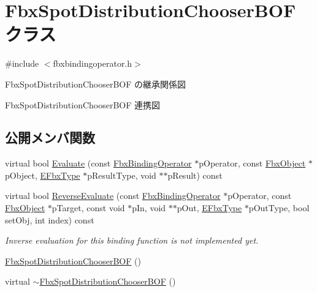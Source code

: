 \hypertarget{class_fbx_spot_distribution_chooser_b_o_f}{}\section{Fbx\+Spot\+Distribution\+Chooser\+B\+OF クラス}
\label{class_fbx_spot_distribution_chooser_b_o_f}


{\ttfamily \#include $<$fbxbindingoperator.\+h$>$}



Fbx\+Spot\+Distribution\+Chooser\+B\+OF の継承関係図


Fbx\+Spot\+Distribution\+Chooser\+B\+OF 連携図
\subsection*{公開メンバ関数}
\begin{DoxyCompactItemize}
\item 
virtual bool \hyperlink{class_fbx_spot_distribution_chooser_b_o_f_a3372ac6ab54e4d20b6646b953f7feecf}{Evaluate} (const \hyperlink{class_fbx_binding_operator}{Fbx\+Binding\+Operator} $\ast$p\+Operator, const \hyperlink{class_fbx_object}{Fbx\+Object} $\ast$p\+Object, \hyperlink{fbxpropertytypes_8h_a73913a5ddfb20e57c6f25e9e6784bd92}{E\+Fbx\+Type} $\ast$p\+Result\+Type, void $\ast$$\ast$p\+Result) const
\item 
virtual bool \hyperlink{class_fbx_spot_distribution_chooser_b_o_f_a8442158a644f0c6c24cbcf30d86413c7}{Reverse\+Evaluate} (const \hyperlink{class_fbx_binding_operator}{Fbx\+Binding\+Operator} $\ast$p\+Operator, const \hyperlink{class_fbx_object}{Fbx\+Object} $\ast$p\+Target, const void $\ast$p\+In, void $\ast$$\ast$p\+Out, \hyperlink{fbxpropertytypes_8h_a73913a5ddfb20e57c6f25e9e6784bd92}{E\+Fbx\+Type} $\ast$p\+Out\+Type, bool set\+Obj, int index) const
\begin{DoxyCompactList}\small\item\em Inverse evaluation for this binding function is not implemented yet. \end{DoxyCompactList}\item 
\hyperlink{class_fbx_spot_distribution_chooser_b_o_f_a0a7d434d0f332221b4e8f34a7abd007e}{Fbx\+Spot\+Distribution\+Chooser\+B\+OF} ()
\item 
virtual \hyperlink{class_fbx_spot_distribution_chooser_b_o_f_a60708930467656be87365341bdec71d6}{$\sim$\+Fbx\+Spot\+Distribution\+Chooser\+B\+OF} ()
\end{DoxyCompactItemize}
